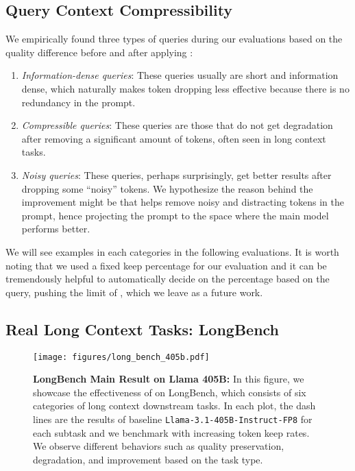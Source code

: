 \subsection{Query Context Compressibility}
We empirically found three types of queries during our evaluations based on the quality difference before and after applying \ours{}: 
\begin{enumerate}
    \item \textit{Information-dense queries}: These queries usually are short and information dense, which naturally makes token dropping less effective because there is no redundancy in the prompt. 
    \item \textit{Compressible queries}: These queries are those that do not get degradation after removing a significant amount of tokens, often seen in long context tasks. 
    \item \textit{Noisy queries}: These queries, perhaps surprisingly, get better results after dropping some ``noisy'' tokens. We hypothesize the reason behind the improvement might be that \ours{} helps remove noisy and distracting tokens in the prompt, hence projecting the prompt to the space where the main model performs better. 
\end{enumerate}
We will see examples in each categories in the following evaluations. It is worth noting that we used a fixed keep percentage for our evaluation and it can be tremendously helpful to automatically decide on the percentage based on the query, pushing the limit of \ours{}, which we leave as a future work. 

\subsection{Real Long Context Tasks: LongBench}
\label{sec:longbench}

\begin{figure*}[t]
\begin{center}
\centerline{\texttt{[image: figures/long\_bench\_405b.pdf]}}
\caption{\textbf{LongBench Main Result on Llama 405B:} In this figure, we showcase the effectiveness of \ours{} on LongBench, which consists of six categories of long context downstream tasks. In each plot, the dash lines are the results of baseline \texttt{Llama-3.1-405B-Instruct-FP8} for each subtask and we benchmark \ours{} with increasing token keep rates. We observe different behaviors such as quality preservation, degradation, and improvement based on the task type. }
\label{fig:longbench_405b}
\end{center}
\vskip -0.2in
\end{figure*}

